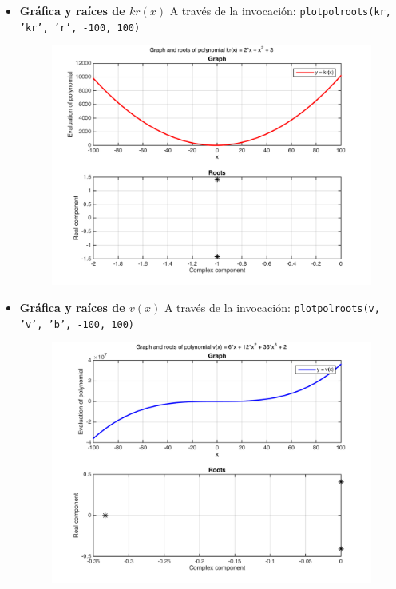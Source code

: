 \documentclass[11pt, spanish]{article}
\begin{document}
\begin{enumerate}
\begin{itemize}
\item \textbf{Gráfica y raíces de $kr(x)$} A través de la invocación: \texttt{plotpolroots(kr, 'kr', 'r', -100, 100)}

\begin{figure}[H]
\centering
	\includegraphics[scale=0.6]{data/img/krplot}
	\caption{}
\end{figure}

\newpage

\item \textbf{Gráfica y raíces de $v(x)$} A través de la invocación: \texttt{plotpolroots(v, 'v', 'b', -100, 100)}

\begin{figure}[H]
\centering
	\includegraphics[scale=0.6]{data/img/vplot}
	\caption{}
\end{figure}


\end{itemize}
\end{enumerate}
\end{document}
